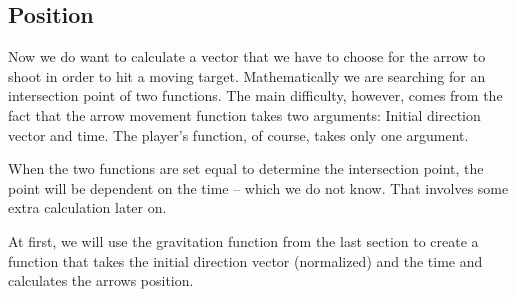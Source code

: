 \subsection{Position}

Now we do want to calculate a vector that we have to choose for the arrow to shoot in order to hit a moving target. Mathematically we are searching for an intersection point of two functions. The main difficulty, however, comes from the fact that the arrow movement function takes two arguments: Initial direction vector and time. The player's function, of course, takes only one argument. 

When the two functions are set equal to determine the intersection point, the point will be dependent on the time – which we do not know. That involves some extra calculation later on.

At first, we will use the gravitation function from the last section to create a function that takes the initial direction vector (normalized) and the time and calculates the arrows position.

